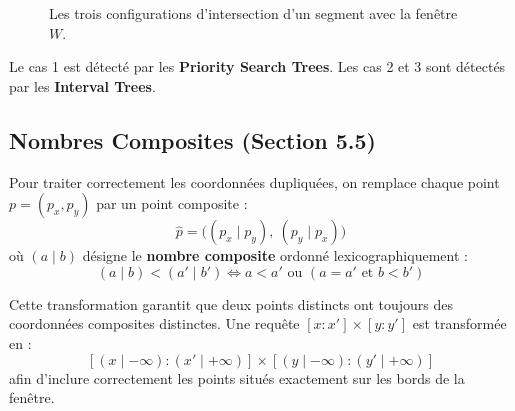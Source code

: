 \documentclass[11pt,a4paper]{article}
\begin{document}
\begin{figure}[h]
\centering
{}
\caption{Les trois configurations d'intersection d'un segment avec la fenêtre $W$.}
\label{fig:cas-intersection}
\end{figure}

Le cas 1 est détecté par les \textbf{Priority Search Trees}. Les cas 2 et 3 sont détectés par les \textbf{Interval Trees}.

\subsection{Nombres Composites (Section 5.5)}

Pour traiter correctement les coordonnées dupliquées, on remplace chaque point $p = (p_x, p_y)$ par un point composite :
\[ \hat{p} = \big((p_x \mid p_y),\ (p_y \mid p_x)\big) \]
où $(a \mid b)$ désigne le \textbf{nombre composite} ordonné lexicographiquement :
\[ (a \mid b) < (a' \mid b') \iff a < a' \text{ ou } (a = a' \text{ et } b < b') \]

Cette transformation garantit que deux points distincts ont toujours des coordonnées composites distinctes. Une requête $[x : x'] \times [y : y']$ est transformée en :
\[ [(x \mid -\infty) : (x' \mid +\infty)] \times [(y \mid -\infty) : (y' \mid +\infty)] \]
afin d'inclure correctement les points situés exactement sur les bords de la fenêtre.
\end{document}
